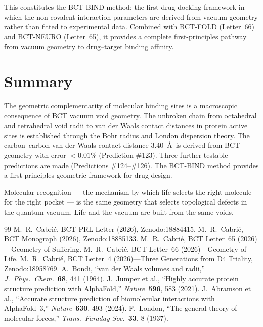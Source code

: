 \documentclass[aps,prl,preprint,superscriptaddress,floatfix]{revtex4-2}
\begin{document}
This constitutes the BCT-BIND method: the first drug docking framework
in which the non-covalent interaction parameters are derived from
vacuum geometry rather than fitted to experimental data. Combined with
BCT-FOLD (Letter~66) and BCT-NEURO (Letter~65), it provides a complete
first-principles pathway from vacuum geometry to drug--target binding
affinity.

\section{Summary}

The geometric complementarity of molecular binding sites is a
macroscopic consequence of BCT vacuum void geometry. The unbroken
chain from octahedral and tetrahedral void radii to van der Waals
contact distances in protein active sites is established through the
Bohr radius and London dispersion theory. The carbon--carbon van der
Waals contact distance $3.40$~\AA\ is derived from BCT geometry with
error $<0.01\%$ (Prediction \#123). Three further testable predictions
are made (Predictions \#124--\#126). The BCT-BIND method provides
a first-principles geometric framework for drug design.

Molecular recognition --- the mechanism by which life selects the
right molecule for the right pocket --- is the same geometry that
selects topological defects in the quantum vacuum. Life and the
vacuum are built from the same voids.

\begin{thebibliography}{99}
 M.~R.~Cabri\'e, BCT PRL Letter (2026), Zenodo:18884415.
 M.~R.~Cabri\'e, BCT Monograph (2026), Zenodo:18885133.
 M.~R.~Cabri\'e, BCT Letter~65 (2026)---Geometry of Suffering.
 M.~R.~Cabri\'e, BCT Letter~66 (2026)---Geometry of Life.
 M.~R.~Cabri\'e, BCT Letter~4 (2026)---Three Generations from
  D4 Triality, Zenodo:18958769.
 A.~Bondi, ``van der Waals volumes and radii,''
  \textit{J.\ Phys.\ Chem.}\ \textbf{68}, 441 (1964).
 J.~Jumper et al., ``Highly accurate protein structure
  prediction with AlphaFold,'' \textit{Nature}\ \textbf{596}, 583 (2021).
 J.~Abramson et al., ``Accurate structure prediction
  of biomolecular interactions with AlphaFold~3,''
  \textit{Nature}\ \textbf{630}, 493 (2024).
 F.~London, ``The general theory of molecular forces,''
  \textit{Trans.\ Faraday Soc.}\ \textbf{33}, 8 (1937).
\end{thebibliography}
\end{document}
